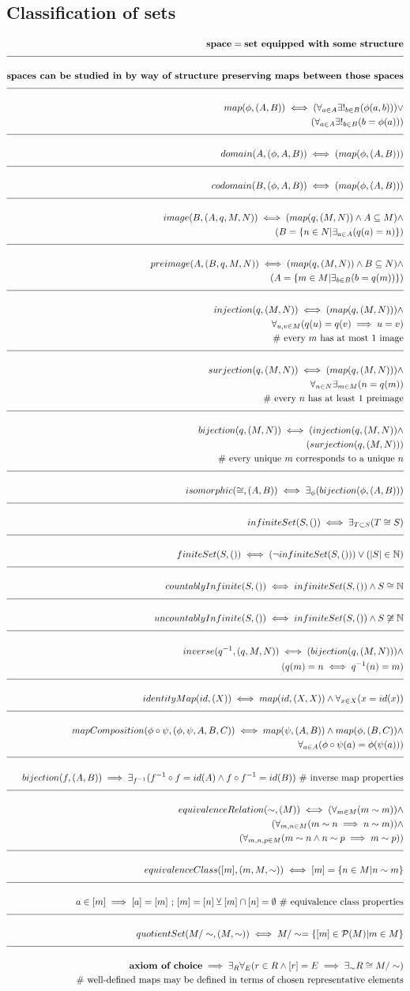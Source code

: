 \documentclass[a4paper]{article}
\newcommand{\eqComment}[1]{\text{  \# #1}}
\newcommand{\eqSep}{\text{ ;  }}
\newcommand{\n}{\\[1.5ex] \hline \nonumber \\[0ex]}
\newcommand{\m}{\nonumber \\}
\begin{document}
\subsection{Classification of sets}
\begin{tcolorbox}
\begin{align}
   \textbf{space} = \textbf{set equipped with some structure}
\n \textbf{spaces can be studied in by way of structure preserving maps between those spaces}
\n map(\phi, (A, B)) \iff (\forall_{a \in A} \exists!_{b \in B} (\phi(a, b))) \lor
\m (\forall_{a \in A} \exists!_{b \in B} (b = \phi(a)))
\n domain(A, (\phi, A, B)) \iff (map(\phi, (A, B)))
\n codomain(B, (\phi, A, B)) \iff (map(\phi, (A, B)))
\n image(B, (A, q, M, N)) \iff (map(q, (M, N)) \land A \subseteq M) \land
\m (B = \{n \in N| \exists_{a \in A} (q(a) = n)\})
\n preimage(A, (B, q, M, N)) \iff (map(q, (M, N)) \land B \subseteq N) \land 
\m (A = \{m \in M| \exists_{b \in B} (b = q(m))\})
\n injection(q, (M, N)) \iff (map(q, (M, N))) \land
\m \forall_{u,v \in M} (q(u) = q(v) \implies u = v)
\m \eqComment{every $m$ has at most $1$ image}
\n surjection(q, (M, N)) \iff (map(q, (M, N))) \land
\m \forall_{n \in N} \exists_{m \in M} (n = q(m))
\m \eqComment{every $n$ has at least $1$ preimage}
\n bijection(q, (M, N)) \iff (injection(q, (M, N)) \land
\m (surjection(q, (M, N)))
\m \eqComment{every unique $m$ corresponds to a unique $n$}
\n isomorphic(\cong, (A, B)) \iff \exists_\phi (bijection(\phi, (A, B)))
\n infiniteSet(S, ()) \iff \exists_{T \subset S} (T \cong S)
\n finiteSet(S, ()) \iff (\lnot infiniteSet(S, ())) \lor (|S| \in \mathbb{N})
\n countablyInfinite(S, ()) \iff infiniteSet(S, ()) \land S \cong \mathbb{N}
\n uncountablyInfinite(S, ()) \iff infiniteSet(S, ()) \land S \centernot\cong \mathbb{N}
\n inverse(q^{-1}, (q, M, N)) \iff (bijection(q, (M, N))) \land
\m (q(m) = n \iff q^{-1}(n) = m)
\n identityMap(id, (X)) \iff map(id, (X, X)) \land \forall_{x \in X} (x = id(x))
\n mapComposition(\phi \circ \psi, (\phi, \psi, A, B, C)) \iff map(\psi, (A, B)) \land map(\phi, (B, C)) \land
\m \forall_{a \in A} (\phi \circ \psi(a) = \phi(\psi(a)))
\n bijection(f, (A, B)) \implies \exists_{f^{-1}} (f^{-1} \circ f = id(A) \land f \circ f^{-1} = id(B)) \eqComment{inverse map properties}
\n equivalenceRelation(\sim, (M)) \iff (\forall_{m \in M} (m \sim m)) \land
\m (\forall_{m, n \in M} (m \sim n \implies n \sim m)) \land
\m (\forall_{m, n, p \in M} (m \sim n \land n \sim p \implies m \sim p))
\n equivalenceClass([m], (m, M, \sim)) \iff [m] = \{n \in M| n \sim m\}
\n a \in [m] \implies [a] = [m] \eqSep [m] = [n] \veebar [m] \cap [n] = \emptyset \eqComment{equivalence class properties}
\n quotientSet(M / \sim, (M, \sim)) \iff M / \sim = \{[m] \in \mathcal{P}(M) | m \in M\}
\n \textbf{axiom of choice} \implies \exists_R \forall_E (r \in R \land [r] = E \implies \exists_\sim R \cong M / \sim)
\m \eqComment{well-defined maps may be defined in terms of chosen representative elements}
\end{align}
\end{tcolorbox}
\end{document}
